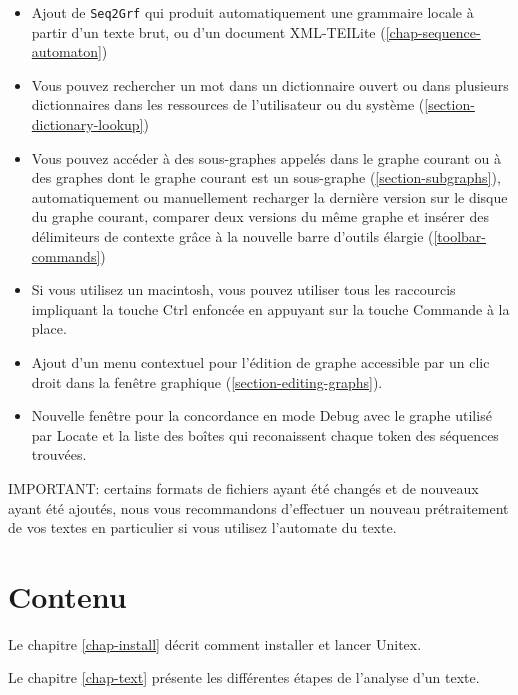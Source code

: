 \begin{itemize}
  \item Ajout de \verb$Seq2Grf$ qui produit automatiquement une grammaire locale à partir d'un texte
	brut, ou d'un document XML-TEILite (\ref{chap-sequence-automaton})
	
  \item Vous pouvez rechercher un mot dans un dictionnaire ouvert ou dans plusieurs dictionnaires
  	  dans les ressources de l'utilisateur ou du système (\ref{section-dictionary-lookup})
	
  \item Vous pouvez accéder à des sous-graphes appelés dans le graphe courant ou à des graphes dont
  le graphe courant est un sous-graphe (\ref{section-subgraphs}), automatiquement ou manuellement
  recharger la dernière version sur le disque du graphe courant, comparer deux versions du même
  graphe et insérer des délimiteurs de contexte grâce à la nouvelle barre d'outils
  élargie (\ref{toolbar-commands})
	
  \item Si vous utilisez un macintosh, vous pouvez utiliser tous les raccourcis impliquant la touche
	Ctrl enfoncée en appuyant sur la touche Commande à la place.
	
  \item Ajout d'un menu contextuel pour l'édition de graphe accessible par un clic droit dans la
	fenêtre graphique (\ref{section-editing-graphs}).
	
  \item Nouvelle fenêtre pour la concordance en mode Debug avec le graphe utilisé par Locate et la liste des boîtes qui reconaissent chaque token des séquences trouvées.
\end{itemize}

\bigskip
\noindent IMPORTANT: certains formats de fichiers ayant été changés et de nouveaux ayant été
ajoutés, nous vous recommandons d'effectuer un nouveau prétraitement de vos textes en particulier si
vous utilisez l'automate du texte.

\clearpage

\section*{Contenu}
\noindent Le chapitre \ref{chap-install} décrit comment installer et lancer Unitex.

\bigskip \noindent Le chapitre \ref{chap-text} présente les différentes étapes de l'analyse d'un
texte.

